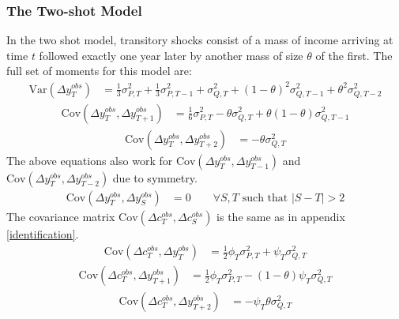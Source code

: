 \subsubsection{The Two-shot Model}
In the two shot model, transitory shocks consist of a mass of income arriving at time $t$ followed exactly one year later by another mass of size $\theta$ of the first. The full set of moments for this model are:
\begin{align}
\mathrm{Var}(\Delta y^{obs}_T) &= \frac{1}{3}\sigma^2_{P,T} + \frac{1}{3}\sigma^2_{P,T-1} +  \sigma^2_{Q,T}   +(1-\theta)^2 \sigma^2_{Q,T-1} + \theta^2\sigma^2_{Q,T-2}
\end{align}
\begin{align}
\mathrm{Cov}(\Delta y^{obs}_T, \Delta y^{obs}_{T+1}) &= \frac{1}{6}\sigma^2_{P,T}  -\theta \sigma^2_{Q,T}  +\theta (1-\theta) \sigma^2_{Q,T-1}
\end{align}
\begin{align}
\mathrm{Cov}(\Delta y^{obs}_T, \Delta y^{obs}_{T+2})&= -\theta \sigma^2_{Q,T}
\end{align}
The above equations also work for $\mathrm{Cov}(\Delta y^{obs}_T, \Delta y^{obs}_{T-1})$ and $\mathrm{Cov}(\Delta y^{obs}_T, \Delta y^{obs}_{T-2})$ due to symmetry.
\begin{align}
\mathrm{Cov}(\Delta y^{obs}_T, \Delta y^{obs}_{S}) &= 0 \qquad \forall S,T \text{ such that }|S-T| >2 
\end{align}
The covariance matrix $\mathrm{Cov}(\Delta c^{obs}_T, \Delta c^{obs}_{S})$ is the same as in appendix \ref{identification}.
\begin{align}
\mathrm{Cov}(\Delta c^{obs}_T, \Delta y^{obs}_T) &= \frac{1}{2} \phi_T \sigma^2_{P,T} + \psi_T \sigma^2_{Q,T} 
\end{align}
\begin{align}
\mathrm{Cov}(\Delta c^{obs}_T, \Delta y^{obs}_{T+1})&= \frac{1}{2} \phi_T \sigma^2_{P,T} - (1-\theta) \psi_T \sigma^2_{Q,T} 
\end{align}
\begin{align}
\mathrm{Cov}(\Delta c^{obs}_T, \Delta y^{obs}_{T+2}) &= -\psi_T  \theta \sigma^2_{Q,T}
\end{align}